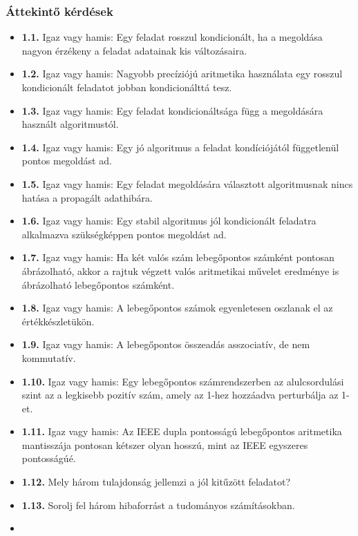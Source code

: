 \documentclass[
  magyar,
  11pt]{article}
\providecommand{\tightlist}{%
  \setlength{\itemsep}{0pt}\setlength{\parskip}{0pt}}
\begin{document}
\subsubsection{Áttekintő
kérdések}\label{uxe1ttekintux151-kuxe9rduxe9sek}

\begin{itemize}
\tightlist
\item
  \textbf{1.1.} Igaz vagy hamis: Egy feladat rosszul kondicionált, ha a
  megoldása nagyon érzékeny a feladat adatainak kis változásaira.
\item
  \textbf{1.2.} Igaz vagy hamis: Nagyobb precíziójú aritmetika
  használata egy rosszul kondicionált feladatot jobban kondicionálttá
  tesz.
\item
  \textbf{1.3.} Igaz vagy hamis: Egy feladat kondicionáltsága függ a
  megoldására használt algoritmustól.
\item
  \textbf{1.4.} Igaz vagy hamis: Egy jó algoritmus a feladat
  kondíciójától függetlenül pontos megoldást ad.
\item
  \textbf{1.5.} Igaz vagy hamis: Egy feladat megoldására választott
  algoritmusnak nincs hatása a propagált adathibára.
\item
  \textbf{1.6.} Igaz vagy hamis: Egy stabil algoritmus jól kondicionált
  feladatra alkalmazva szükségképpen pontos megoldást ad.
\item
  \textbf{1.7.} Igaz vagy hamis: Ha két valós szám lebegőpontos számként
  pontosan ábrázolható, akkor a rajtuk végzett valós aritmetikai művelet
  eredménye is ábrázolható lebegőpontos számként.
\item
  \textbf{1.8.} Igaz vagy hamis: A lebegőpontos számok egyenletesen
  oszlanak el az értékkészletükön.
\item
  \textbf{1.9.} Igaz vagy hamis: A lebegőpontos összeadás asszociatív,
  de nem kommutatív.
\item
  \textbf{1.10.} Igaz vagy hamis: Egy lebegőpontos számrendszerben az
  alulcsordulási szint az a legkisebb pozitív szám, amely az 1-hez
  hozzáadva perturbálja az 1-et.
\item
  \textbf{1.11.} Igaz vagy hamis: Az IEEE dupla pontosságú lebegőpontos
  aritmetika mantisszája pontosan kétszer olyan hosszú, mint az IEEE
  egyszeres pontosságúé.
\item
  \textbf{1.12.} Mely három tulajdonság jellemzi a jól kitűzött
  feladatot?
\item
  \textbf{1.13.} Sorolj fel három hibaforrást a tudományos
  számításokban.
\item

\end{itemize}
\end{document}
